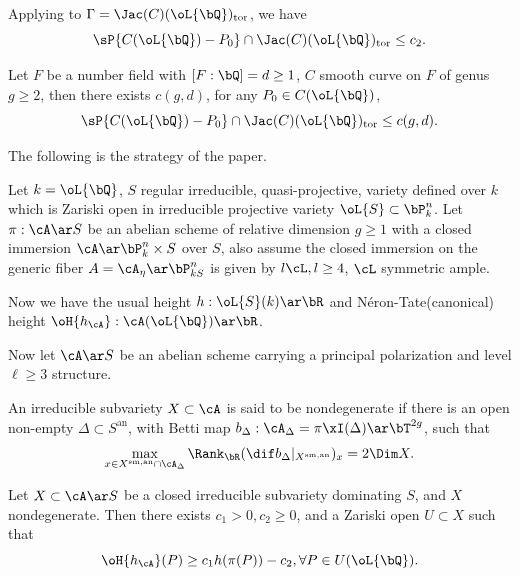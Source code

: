 \begin{cor}
  Applying to $\Gamma=\Jac(C)(\oL{\bQ})_{\mathrm{tor}}$, we have
  \[
    \sP{C(\oL{\bQ})-P_{0}}\cap\Jac(C)(\oL{\bQ})_{\mathrm{tor}}\leq c_{2}.
  \]
\end{cor}

\begin{thm}
  Let $F$ be a number field with $[F:\bQ]=d\geq 1$, $C$ smooth curve on $F$ of genus $g\geq 2$, then there exists $c(g,d)$, for any $P_{0}\in C(\oL{\bQ})$,
  \[
    \sP{C(\oL{\bQ})-P_{0}}\cap\Jac(C)(\oL{\bQ})_{\mathrm{tor}}\leq c(g,d).
  \]
\end{thm}
\begin{rmk}

  The following is the strategy of the paper.
\end{rmk}

\begin{stp}
  Let $k=\oL{\bQ}$, $S$ regular irreducible, quasi-projective, variety defined over $k$ which is Zariski open in irreducible projective variety $\oL{S}\subset\bP_{k}^{n}$. Let $\pi:\cA\ar S$ be an abelian scheme of relative dimension $g\geq 1$ with a closed immersion $\cA\ar\bP_{k}^{n}\times S$ over $S$, also assume the closed immersion on the generic fiber $A=\cA_{\eta}\ar\bP_{k{S}}^{n}$ is given by $l\cL, l\geq 4$, $\cL$ symmetric ample.

  Now we have the usual height $h:\oL{S}(k)\ar\bR$ and N{\'e}ron-Tate(canonical) height $\oH{h_{\cA}}:\cA(\oL{\bQ})\ar\bR$.

  Now let $\cA\ar S$ be an abelian scheme carrying a principal polarization and level $\ell\geq 3$ structure.
\end{stp}
\begin{dfn}
  An irreducible subvariety $X\subset\cA$ is said to be nondegenerate if there is an open non-empty $\Delta\subset S^{\mathrm{an}}$, with Betti map $b_{\Delta}:\cA_{\Delta}=\pi\xI(\Delta)\ar\bT^{2g}$, such that
  \[
    \max_{x\in X^{\mathrm{sm,an}}\cap\cA_{\Delta}}\Rank_{\bR}(\dif b_{\Delta}|_{X^{\mathrm{sm,an}}})_{x}=2\Dim X.
  \]
\end{dfn}

\begin{thm}\label{thm:htieqlt}
  Let $X\subset \cA\ar S$ be a closed irreducible subvariety dominating $S$, and $X$ nondegenerate. Then there exists $c_{1}>0, c_{2}\geq 0$, and a Zariski open $U\subset X$ such that
  \[
    \oH{h_{\cA}}(P)\geq c_{1}h(\pi(P))-c_{2}, \forall P\in U(\oL{\bQ}).
  \]
\end{thm}

